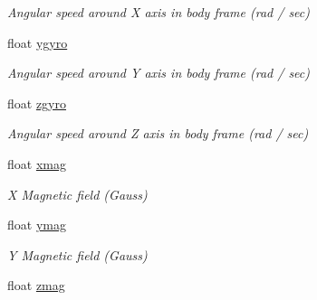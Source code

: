 \begin{DoxyCompactItemize}
\begin{DoxyCompactList}\small\item\em Angular speed around X axis in body frame (rad / sec) \end{DoxyCompactList}\item 
\hypertarget{struct____mavlink__hil__sensor__t_abdeea02a356a5802b5580fdd945bcbe6}{float \hyperlink{struct____mavlink__hil__sensor__t_abdeea02a356a5802b5580fdd945bcbe6}{ygyro}}\label{struct____mavlink__hil__sensor__t_abdeea02a356a5802b5580fdd945bcbe6}

\begin{DoxyCompactList}\small\item\em Angular speed around Y axis in body frame (rad / sec) \end{DoxyCompactList}\item 
\hypertarget{struct____mavlink__hil__sensor__t_ab7c2f35160da57fecb77a7e6b7d48dc9}{float \hyperlink{struct____mavlink__hil__sensor__t_ab7c2f35160da57fecb77a7e6b7d48dc9}{zgyro}}\label{struct____mavlink__hil__sensor__t_ab7c2f35160da57fecb77a7e6b7d48dc9}

\begin{DoxyCompactList}\small\item\em Angular speed around Z axis in body frame (rad / sec) \end{DoxyCompactList}\item 
\hypertarget{struct____mavlink__hil__sensor__t_a246f9f9b48771987750d94e15a0465f3}{float \hyperlink{struct____mavlink__hil__sensor__t_a246f9f9b48771987750d94e15a0465f3}{xmag}}\label{struct____mavlink__hil__sensor__t_a246f9f9b48771987750d94e15a0465f3}

\begin{DoxyCompactList}\small\item\em X Magnetic field (Gauss) \end{DoxyCompactList}\item 
\hypertarget{struct____mavlink__hil__sensor__t_a0693da306eb0d30f2b5502e51540d05b}{float \hyperlink{struct____mavlink__hil__sensor__t_a0693da306eb0d30f2b5502e51540d05b}{ymag}}\label{struct____mavlink__hil__sensor__t_a0693da306eb0d30f2b5502e51540d05b}

\begin{DoxyCompactList}\small\item\em Y Magnetic field (Gauss) \end{DoxyCompactList}\item 
\hypertarget{struct____mavlink__hil__sensor__t_a6db8180441080e7dcccfda7da09b1e2d}{float \hyperlink{struct____mavlink__hil__sensor__t_a6db8180441080e7dcccfda7da09b1e2d}{zmag}}\label{struct____mavlink__hil__sensor__t_a6db8180441080e7dcccfda7da09b1e2d}


\end{DoxyCompactItemize}
